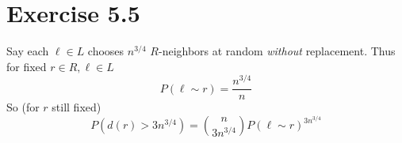 \section*{Exercise 5.5}

Say each $\ell \in L$ chooses $n^{3/4}$ $R$-neighbors at random \emph{without} replacement.
Thus for fixed $r \in R, \ell \in L$
\[ P( \ell \sim r ) = \frac{n^{3/4}}{n} \]
So (for $r$ still fixed)
\[ P( d(r) > 3 n^{3/4} ) = \binom{n}{3n^{3/4}} P(\ell \sim r)^{3 n^{3/4}} \]
